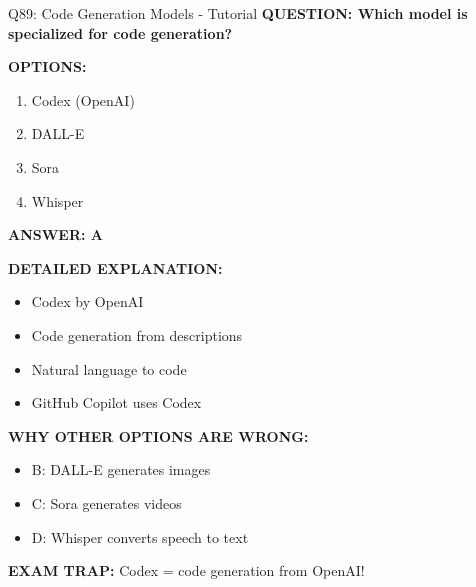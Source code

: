\documentclass[8pt]{beamer}
\begin{document}
	\begin{frame}{Q89: Code Generation Models - Tutorial}
		\fontsize{6.5}{7.5}\selectfont
		\textbf{QUESTION: Which model is specialized for code generation?}
		
		\vspace{0.1cm}
		\textbf{OPTIONS:}
		\begin{enumerate}
			\item Codex (OpenAI)
			\item DALL-E
			\item Sora
			\item Whisper
		\end{enumerate}
		
		\vspace{0.1cm}
		\textcolor{myblue}{\textbf{ANSWER: A}}
		
		\vspace{0.1cm}
		\textbf{DETAILED EXPLANATION:}
		\begin{itemize}
			\item Codex by OpenAI
			\item Code generation from descriptions
			\item Natural language to code
			\item GitHub Copilot uses Codex
		\end{itemize}
		
		\vspace{0.1cm}
		\textcolor{myred}{\textbf{WHY OTHER OPTIONS ARE WRONG:}}
		\begin{itemize}
			\item \textcolor{myred}{B:} DALL-E generates images
			\item \textcolor{myred}{C:} Sora generates videos
			\item \textcolor{myred}{D:} Whisper converts speech to text
		\end{itemize}
		
		\textcolor{myred}{\textbf{EXAM TRAP:}} Codex = \textcolor{myblue}{code generation} from OpenAI!
	\end{frame}
	
\end{document}
